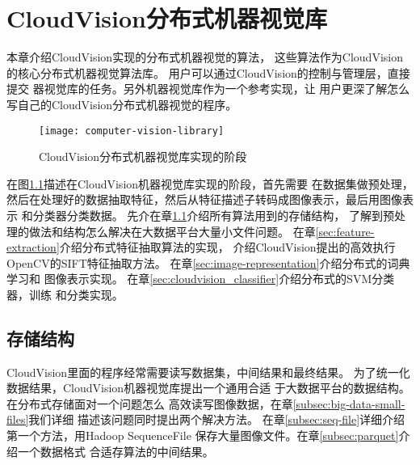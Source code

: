 \chapter{CloudVision分布式机器视觉库}
\label{cha:distributed_vision_library}
本章介绍CloudVision实现的分布式机器视觉的算法，
这些算法作为CloudVision的核心分布式机器视觉算法库。
用户可以通过CloudVision的控制与管理层，直接提交
器视觉库的任务。另外机器视觉库作为一个参考实现，让
用户更深了解怎么写自己的CloudVision分布式机器视觉的程序。

\begin{figure}[h]
  \centering
    \texttt{[image: computer-vision-library]}
  \caption{CloudVision分布式机器视觉库实现的阶段}
  \label{fig:computer-vision-library}
\end{figure}
在图\ref{fig:computer-vision-library}描述在CloudVision机器视觉库实现的阶段，首先需要
在数据集做预处理，然后在处理好的数据抽取特征，然后从特征描述子转码成图像表示，最后用图像表示
和分类器分类数据。
先介在章\ref{sec:storage_format}介绍所有算法用到的存储结构，
了解到预处理的做法和结构怎么解决在大数据平台大量小文件问题。
在章\ref{sec:feature-extraction}介绍分布式特征抽取算法的实现，
介绍CloudVision提出的高效执行OpenCV的SIFT特征抽取方法。
在章\ref{sec:image-representation}介绍分布式的词典学习和
图像表示实现。
在章\ref{sec:cloudvision_classifier}介绍分布式的SVM分类器，训练
和分类实现。


\section{存储结构}
\label{sec:storage_format}
CloudVision里面的程序经常需要读写数据集，中间结果和最终结果。
为了统一化数据结果，CloudVision机器视觉库提出一个通用合适
于大数据平台的数据结构。在分布式存储面对一个问题怎么
高效读写图像数据，在章\ref{subsec:big-data-small-files}我们详细
描述该问题同时提出两个解决方法。
在章\ref{subsec:seq-file}详细介绍第一个方法，用Hadoop SequenceFile
保存大量图像文件。在章\ref{subsec:parquet}介绍一个数据格式
合适存算法的中间结果。


